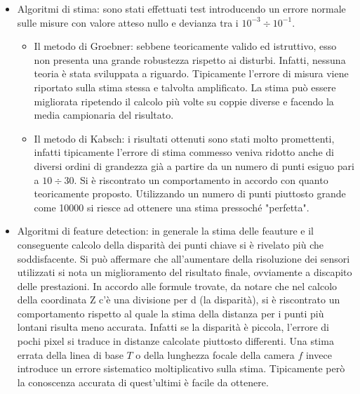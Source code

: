 \begin{itemize}
	\item Algoritmi di stima: sono stati effettuati test introducendo un errore normale sulle misure con valore atteso nullo e devianza tra i $10^{-3} \div 10^{-1}$.
	\begin{itemize}
		\item Il metodo di Groebner: sebbene teoricamente valido ed istruttivo, esso non presenta una grande robustezza rispetto ai disturbi. Infatti, nessuna teoria è stata sviluppata a riguardo. Tipicamente l'errore di misura viene riportato sulla stima stessa e talvolta amplificato. La stima può essere migliorata ripetendo il calcolo più volte su coppie diverse e facendo la media campionaria del risultato.
		\item Il metodo di Kabsch: i risultati ottenuti sono stati molto promettenti, infatti tipicamente l'errore di stima commesso veniva ridotto anche di diversi ordini di grandezza già a partire da un numero di punti esiguo pari a $10 \div 30$. Si è riscontrato un comportamento in accordo con quanto teoricamente proposto. Utilizzando un numero di punti piuttosto grande come 10000 si riesce ad ottenere una stima pressoché "perfetta".
	\end{itemize}
	\item Algoritmi di feature detection: in generale la stima delle feauture e il conseguente calcolo della disparità dei punti chiave si è rivelato più che soddisfacente. Si può affermare che all'aumentare della risoluzione dei sensori utilizzati si nota un miglioramento del risultato finale, ovviamente a discapito delle prestazioni. In accordo alle formule trovate, da notare che nel calcolo della coordinata Z c'è una divisione per d (la disparità), si è riscontrato un comportamento rispetto al quale la stima della distanza per i punti più lontani risulta meno accurata. Infatti se la disparità è piccola, l'errore di pochi pixel si traduce in distanze calcolate piuttosto differenti. Una stima errata della linea di base $T$ o della lunghezza focale della camera $f$ invece introduce un errore sistematico moltiplicativo sulla stima. Tipicamente però la conoscenza accurata di quest'ultimi è facile da ottenere.
	

\end{itemize}
